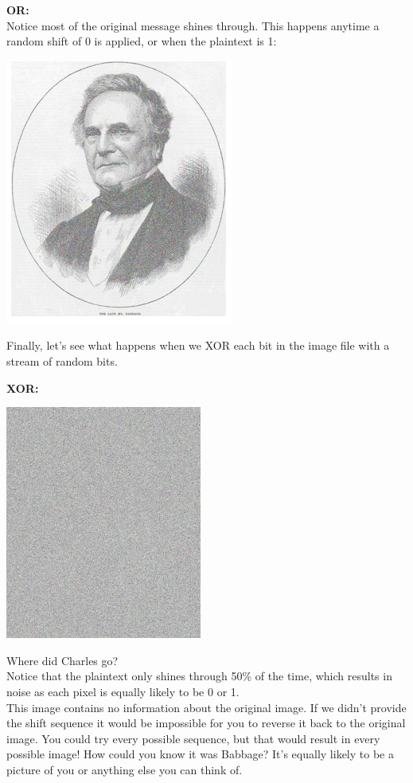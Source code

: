\documentclass{report}
\begin{document}
{\textbf{OR:}\\
Notice most of the original message shines through. This happens anytime a random shift of 0 is applied, or when the plaintext is 1:
\begin{center}
	\includegraphics[scale=1]{19.png}
\end{center}
Finally, let’s see what happens when we XOR each bit in the image file with a stream of random bits.

\textbf{XOR:}
\begin{center}
	\includegraphics[scale=1]{20.png}
\end{center}
Where did Charles go?\\
Notice that the plaintext only shines through 50\% of the time, which results in noise as each pixel is equally likely to be 0 or 1.\\
This image contains no information about the original image. If we didn’t provide the shift sequence it would be impossible for you to reverse it back to the original image. You could try every possible sequence, but that would result in every possible image! How could you know it was Babbage? It's equally likely to be a picture of you or anything else you can think of.


}
\end{document}
